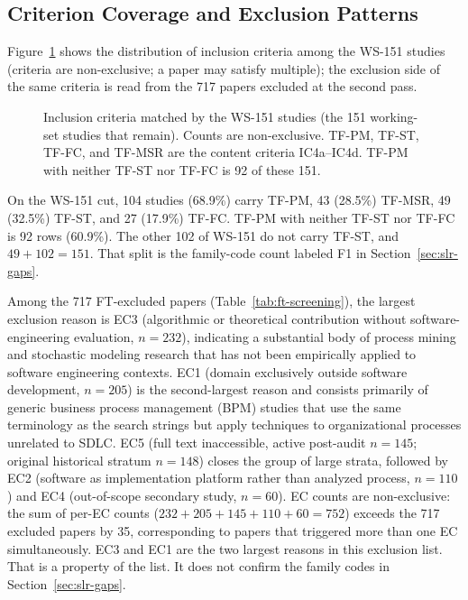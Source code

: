 \subsection{Criterion Coverage and Exclusion Patterns}

Figure~\ref{fig:ic-dist} shows the distribution of inclusion criteria among
the WS-151 studies (criteria are non-exclusive; a paper may satisfy
multiple); the exclusion side of the same criteria is read from the 717
papers excluded at the second pass.

\begin{figure}[htbp]
\centering
{}
\caption{Inclusion criteria matched by the WS-151 studies (the 151
working-set studies that remain). Counts
are non-exclusive. TF-PM, TF-ST, TF-FC, and TF-MSR are the content criteria
IC4a--IC4d. TF-PM with neither TF-ST nor TF-FC is 92 of these 151.}
\label{fig:ic-dist}
\end{figure}

On the WS-151 cut, 104 studies (68.9\%) carry TF-PM, 43 (28.5\%)
TF-MSR, 49 (32.5\%) TF-ST, and 27 (17.9\%) TF-FC. TF-PM with neither TF-ST nor TF-FC
is 92 rows (60.9\%). The
other 102 of WS-151 do not carry TF-ST, and $49+102=151$. That split is
the family-code count labeled F1 in Section~\ref{sec:slr-gaps}.

Among the 717 FT-excluded papers (Table~\ref{tab:ft-screening}), the largest
exclusion reason is EC3 (algorithmic or theoretical contribution without
software-engineering evaluation, $n=232$), indicating a substantial body of
process mining and stochastic modeling research that has not been empirically
applied to software engineering contexts. EC1 (domain exclusively outside
software development, $n=205$) is the second-largest reason and consists
primarily of generic business process management (BPM) studies that use the
same terminology as the search strings but apply techniques to organizational
processes unrelated to SDLC. EC5 (full text inaccessible, active post-audit
$n=145$; original historical stratum $n=148$) closes the group of large
strata, followed by EC2 (software as implementation platform
rather than analyzed process, $n=110$) and EC4 (out-of-scope secondary study,
$n=60$). EC counts are non-exclusive: the sum of per-EC counts
($232+205+145+110+60 = 752$) exceeds the 717 excluded papers by 35,
corresponding to papers that triggered more than one EC simultaneously. EC3
and EC1 are the two largest reasons in this exclusion list. That is a
property of the list. It does not confirm the family codes in
Section~\ref{sec:slr-gaps}.

